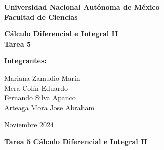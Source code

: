 \documentclass{article}
\begin{document}
\begin{center}
   \vspace{2cm} %

   {\LARGE \textbf{Universidad Nacional Autónoma de México} \\[0.3cm]
    \LARGE \textbf{Facultad de Ciencias}}

   \vspace{1cm} %

   {\Large \textbf{Cálculo Diferencial e Integral II \\ Tarea 5}}

   \vspace{1cm} %

   {\Large \textbf{Integrantes:}}
   
   \vspace{0.5cm} %
   
   \Large
   Mariana Zamudio Marín \\
   Mera Colín Eduardo\\
   Fernando Silva Apanco\\
   Arteaga Mora Jose Abraham

   \vspace{1cm} %

   \Large Noviembre 2024
\end{center}

\vspace{5cm} %

\newcommand{\N}{\ensuremath{\mathbb N }}
\newcommand{\Z}{\ensuremath{\mathbb Z }}
\newcommand{\R}{\ensuremath{\mathbb R }}
\begin{center}


\textbf{Tarea 5}
\textbf{C\'alculo Diferencial e Integral II}
\end{center}
\end{document}
